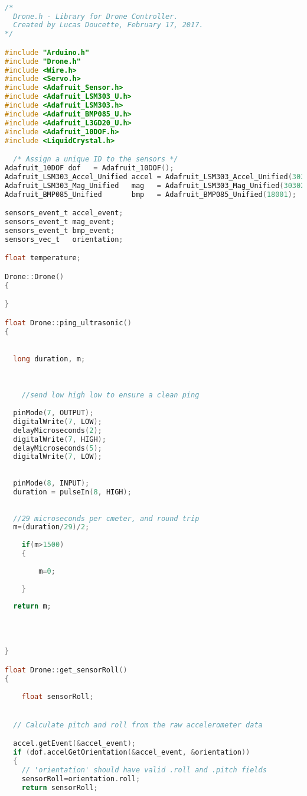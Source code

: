 \begin{lstlisting}[language=C,caption={Drone.cpp Arduino Library File},label={lst:Drone.cpp}]

/*
  Drone.h - Library for Drone Controller.
  Created by Lucas Doucette, February 17, 2017.
*/

#include "Arduino.h"
#include "Drone.h"
#include <Wire.h>
#include <Servo.h>
#include <Adafruit_Sensor.h>
#include <Adafruit_LSM303_U.h>
#include <Adafruit_LSM303.h>
#include <Adafruit_BMP085_U.h>
#include <Adafruit_L3GD20_U.h>
#include <Adafruit_10DOF.h>
#include <LiquidCrystal.h>

  /* Assign a unique ID to the sensors */
Adafruit_10DOF dof   = Adafruit_10DOF();
Adafruit_LSM303_Accel_Unified accel = Adafruit_LSM303_Accel_Unified(30301);
Adafruit_LSM303_Mag_Unified   mag   = Adafruit_LSM303_Mag_Unified(30302);
Adafruit_BMP085_Unified       bmp   = Adafruit_BMP085_Unified(18001);

sensors_event_t accel_event;
sensors_event_t mag_event;
sensors_event_t bmp_event;
sensors_vec_t   orientation;

float temperature;

Drone::Drone()
{

}

float Drone::ping_ultrasonic()
{
    

  long duration, m;

    
    
    //send low high low to ensure a clean ping
    
  pinMode(7, OUTPUT);
  digitalWrite(7, LOW);
  delayMicroseconds(2);
  digitalWrite(7, HIGH);
  delayMicroseconds(5);
  digitalWrite(7, LOW);
  
    
  pinMode(8, INPUT);
  duration = pulseIn(8, HIGH);
    
  
  //29 microseconds per cmeter, and round trip  
  m=(duration/29)/2;
    
    if(m>1500)
    {
        
        m=0;
        
    }
    
  return m;
    

    
    
}

float Drone::get_sensorRoll()
{
    
    float sensorRoll;


  // Calculate pitch and roll from the raw accelerometer data

  accel.getEvent(&accel_event);
  if (dof.accelGetOrientation(&accel_event, &orientation))
  {
    // 'orientation' should have valid .roll and .pitch fields
    sensorRoll=orientation.roll;
    return sensorRoll;



\end{lstlisting}
